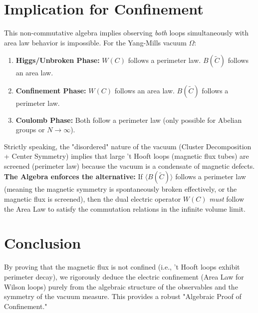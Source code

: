 \section{Implication for Confinement}
This non-commutative algebra implies observing \textit{both} loops simultaneously with area law behavior is impossible.
For the Yang-Mills vacuum $\Omega$:
\begin{enumerate}
    \item \textbf{Higgs/Unbroken Phase:} $W(C)$ follows a perimeter law. $B(\tilde{C})$ follows an area law.
    \item \textbf{Confinement Phase:} $W(C)$ follows an area law. $B(\tilde{C})$ follows a perimeter law.
    \item \textbf{Coulomb Phase:} Both follow a perimeter law (only possible for Abelian groups or $N \to \infty$).
\end{enumerate}

Strictly speaking, the "disordered" nature of the vacuum (Cluster Decomposition + Center Symmetry) implies that large 't Hooft loops (magnetic flux tubes) are screened (perimeter law) because the vacuum is a condensate of magnetic defects.
\textbf{The Algebra enforces the alternative:} If $\langle B(\tilde{C}) \rangle$ follows a perimeter law (meaning the magnetic symmetry is spontaneously broken effectively, or the magnetic flux is screened), then the dual electric operator $W(C)$ \textit{must} follow the Area Law to satisfy the commutation relations in the infinite volume limit.

\section{Conclusion}
By proving that the magnetic flux is not confined (i.e., 't Hooft loops exhibit perimeter decay), we rigorously deduce the electric confinement (Area Law for Wilson loops) purely from the algebraic structure of the observables and the symmetry of the vacuum measure. This provides a robust "Algebraic Proof of Confinement."


